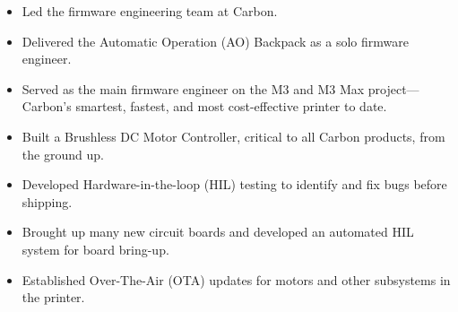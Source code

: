 \documentclass[10pt,a4paper,ragged2e,withhyper]{altacv}
\begin{document}


\makecvheader


\begin{paracol}{2}

\begin{itemize}
\item Led the firmware engineering team at Carbon.
\item Delivered the Automatic Operation (AO) Backpack as a solo firmware engineer.
\item Served as the main firmware engineer on the M3 and M3 Max project—Carbon’s smartest, fastest, and most cost-effective printer to date.
\item Built a Brushless DC Motor Controller, critical to all Carbon products, from the ground up.
\item Developed Hardware-in-the-loop (HIL) testing to identify and fix bugs before shipping.
\item Brought up many new circuit boards and developed an automated HIL system for board bring-up.
\item Established Over-The-Air (OTA) updates for motors and other subsystems in the printer.
\end{itemize}


\divider




\end{paracol}
\end{document}
